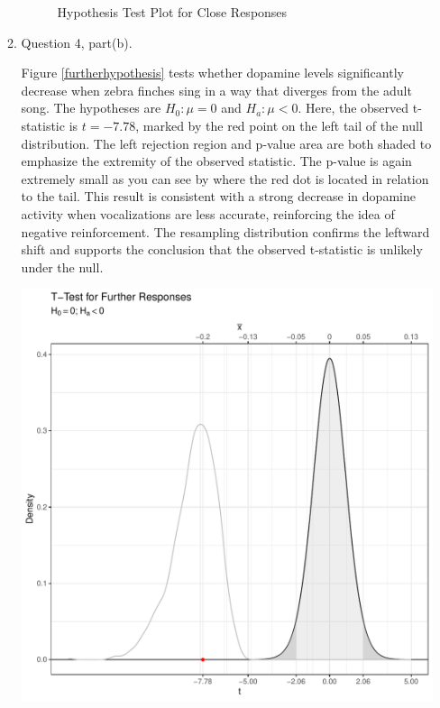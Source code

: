 \documentclass{article}\usepackage[]{graphicx}\usepackage[]{xcolor}
\makeatletter
\def\maxwidth{ %
  \ifdim\Gin@nat@width>\linewidth
    \linewidth
  \else
    \Gin@nat@width
  \fi
}
\newenvironment{knitrout}{}{} %
\makeatother
\begin{document}
\begin{enumerate}
\begin{enumerate}
\begin{figure}[H]
\begin{center}

\caption{Hypothesis Test Plot for Close Responses}
\label{closehypothesis} %
\end{center}
\end{figure}
  
  \item Question 4, part(b).
  
  Figure \ref{furtherhypothesis} tests whether dopamine levels significantly decrease
  when zebra finches sing in a way that diverges from the adult song. The hypotheses
  are $H_0: \mu = 0$ and $H_a: \mu < 0$. Here, the observed t-statistic is $t=-7.78$,
  marked by the red point on the left tail of the null distribution. The left rejection
  region and p-value area are both shaded to emphasize the extremity of the observed
  statistic. The p-value is again extremely small as you can see by where the red dot is
  located in relation to the tail. This result is consistent with a strong decrease
  in dopamine activity when vocalizations are less accurate, reinforcing the idea of 
  negative reinforcement. The resampling distribution confirms the leftward shift
  and supports the conclusion that the observed t-statistic is unlikely under the null.
  
\begin{knitrout}\scriptsize
{}\color{fgcolor}
\includegraphics[width=\maxwidth]{figure/plot3-1} 
\end{knitrout}
  

\end{enumerate}
\end{enumerate}
\end{document}

